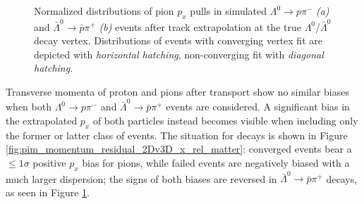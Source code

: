 \begin{figure}[t]
\begin{subfigure}{.45\textwidth}
		\caption{}
		\label{fig:pim_momentum_residual_2Dv3D_x_rel_antimatter}
	\end{subfigure}
	\caption{Normalized distributions of pion $p_x$ pulls in simulated $\Lambda^0 \rightarrow p\pi^-$ \textit{(a)} and $\bar{\Lambda}^0 \rightarrow \bar{p}\pi^+$ \textit{(b)} events after track extrapolation at the true $\Lambda^0$/$\bar{\Lambda}^0$ decay vertex.
	Distributions of events with converging vertex fit are depicted with \textit{horizontal hatching}, non-converging fit with \textit{diagonal hatching}.}
	\label{fig:3:pim_momentum_residual_2Dv3D_x_rel}
\end{figure}

Transverse momenta of proton and pions after transport show no similar biases when both $\Lambda^0 \rightarrow p\pi^-$ and $\bar{\Lambda}^0 \rightarrow \bar{p}\pi^+$ events are considered.
A significant bias in the extrapolated $p_x$ of both particles instead becomes visible when including only the former or latter class of events.
The situation for \lz decays is shown in Figure \ref{fig:pim_momentum_residual_2Dv3D_x_rel_matter}:
converged events bear a $\leq 1\sigma$ positive $p_x$ bias for pions, while failed events are negatively biased with a much larger dispersion; the signs of both biases are reversed 
in $\bar{\Lambda}^0 \rightarrow \bar{p}\pi^+$ decays, as seen in Figure \ref{fig:pim_momentum_residual_2Dv3D_x_rel_antimatter}.

